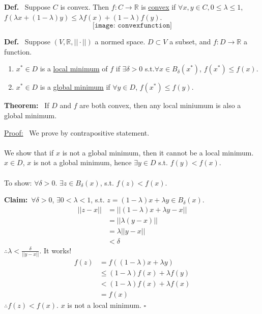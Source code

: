\documentclass[letterpaper]{article}
\newcommand{\real}{\mathbb R}  %
\begin{document}
\noindent \textbf{Def.}~ Suppose $C$ is convex. Then
$f:C\to \real$ is \underline{convex} if $\forall x,y \in C, 0 \leqslant \lambda \leqslant 1$,
$f\left(\lambda x+(1-\lambda) y\right)\leqslant \lambda f(x)+(1-\lambda)f(y)$.
$$\texttt{[image: convexfunction]}$$

\noindent \textbf{Def.}~ Suppose $(V,\real,||\cdot||)$ a normed space. $D\subset V$ a subset, and $f:D\to \real$ a function.
\renewcommand{\labelenumi}{(\alph{enumi})}
\begin{enumerate}
\item
$x^* \in D$ is a \underline{local minimum} of $f$ if $\exists \delta >0$ s.t.$\forall x\in B_\delta(x^*)$,
$f(x^*) \leqslant f(x)$.
\item
$x^* \in D$ is a \underline{global minimum} if $\forall y \in D$, $f(x^*) \leqslant f(y)$.
\end{enumerate}

\noindent \textbf{Theorem:}~ If $D$ and $f$ are both convex, then any local miniumum is also a global minimum.

\noindent \underline{Proof:}~ We prove by contrapositive statement.\\ \\
We show that if $x$ is not a global minimum, then it cannot be a local minimum.\\
$x\in D$, $x$ is not a global minimum, hence $\exists y\in D$ s.t. $f(y)<f(x)$.\\ \\
To show: $\forall \delta >0$. $\exists z\in B_\delta(x)$, s.t. $f(z)<f(x)$.

\noindent \textbf{Claim:}~$\forall \delta >0$, $\exists 0<\lambda<1$, s.t. $z=(1-\lambda)x+\lambda y\in B_\delta (x)$.
    \begin{align*}
        ||z-x||&=||(1-\lambda)x+\lambda y-x||\\
        &=||\lambda(y-x)||\\
        &=\lambda||y-x||\\
        &<\delta
    \end{align*}
$\therefore \lambda <\frac{\delta}{||y-x||}$. It works!\\
    \begin{align*}
        f(z)&=f((1-\lambda)x+\lambda y)\\
        &\leqslant(1-\lambda)f(x)+\lambda f(y)\\
        &<(1-\lambda)f(x)+\lambda f(x)\\
        &=f(x)
    \end{align*}
$\therefore f(z)<f(x)$. $x$ is not a local minimum. $\square$
\end{document}
